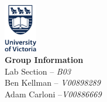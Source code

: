\documentclass{article}
\begin{document}
\begin{center}
    \vspace{2em}
    \includegraphics[width=1.43cm]{uvic_logo.png}\\
    \vspace{4em}
    \textbf{Group Information}\\
    Lab Section -- \textit{B03}\\
    Ben Kellman -- \textit{V00898289}\\
    Adam Carloni --\textit{V00886669}
\end{center}

\newpage
\end{document}
